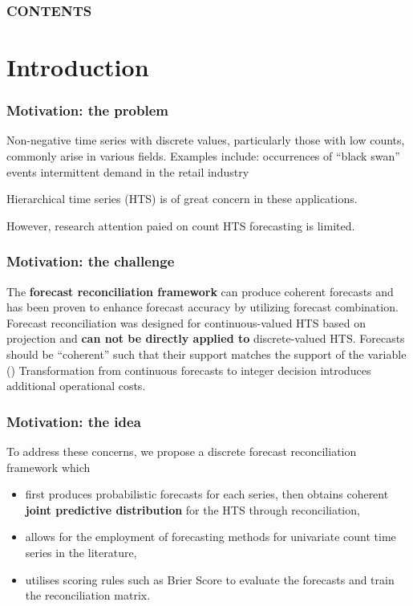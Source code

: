 \documentclass[12pt]{beamer}
\begin{document}
\begin{frame}
    \frametitle{CONTENTS}
    \tableofcontents
\end{frame}


\section{Introduction}
\begin{frame}
\frametitle{Motivation: the problem}

\begin{outline}
\1 Non-negative time series with discrete values, particularly those with low counts, commonly arise in various fields. Examples include:
\2 occurrences of “black swan” events
\2 intermittent demand in the retail industry

\1 Hierarchical time series (HTS) is of great concern in these applications.

\1 {\color{red}However, research attention paied on count HTS forecasting is limited.}

\end{outline}

\end{frame}

\begin{frame}
\frametitle{Motivation: the challenge}

\begin{outline}
\1 The \textbf{forecast reconciliation framework} can produce coherent forecasts and has been proven to enhance forecast accuracy by utilizing forecast combination.
\1 Forecast reconciliation was designed for continuous-valued HTS based on projection and \textbf{can not be directly applied to} discrete-valued HTS.
\2 Forecasts should be “coherent” such that their support matches the support of the variable ()
\2 Transformation from continuous forecasts to integer decision introduces additional operational costs.

\end{outline}

\end{frame}


\begin{frame}
\frametitle{Motivation: the idea}

To address these concerns, we propose a discrete forecast reconciliation framework which

\begin{itemize}
    \item first produces probabilistic forecasts for each series, then obtains coherent \textbf{joint predictive distribution} for the HTS through reconciliation,
    \item allows for the employment of forecasting methods for univariate count time series in the literature,
    \item utilises scoring rules such as Brier Score to evaluate the forecasts and train the reconciliation matrix.
\end{itemize}

\end{frame}
\end{document}
